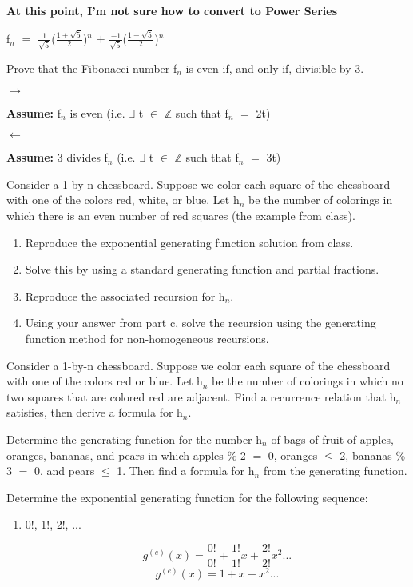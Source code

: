 \documentclass{article}
\newcommand{\mt}[1]{\ensuremath{#1}}
\newcommand{\balist}{\begin{enumerate}[label=\alph*.]}
\newcommand{\elist}{\end{enumerate}}
\newcommand{\as}[1]{\textbf{Assume: } #1}
\newcommand{\bz}{\mt{\mathbb{Z}} }       %
\newcommand{\mem}{\mt{\in} }
\newcommand{\exs}{\mt{\exists} }
\newcommand{\lra}{ \mt{\longrightarrow} } %
\newcommand{\lla}{ \mt{\longleftarrow} }  %
\newcommand{\ps}{\mt{+} }
\newcommand{\lse}{\mt{\leq} }
\newcommand{\eql}{\mt{=} }
\newcommand{\uw}[2]{#1\mt{_{#2}}}
\newcommand{\uf}[2]{#1\mt{^{#2}}}
\newcommand{\frc}[2]{\mt{\frac{#1}{#2}}}
\newcommand{\eqn}[1]{\[#1\]}
\begin{document}
\begin{enumerate}
   \textbf{At this point, I'm not sure how to convert to Power Series}
   
   \uw{f}{n} \eql \frc{1}{\sqrt{5}}\uf{(\frc{1 + \sqrt{5}}{2})}{n} \ps \frc{-1}{\sqrt{5}}\uf{(\frc{1 - \sqrt{5}}{2})}{n}
   
   
   \elist
   \item Prove that the Fibonacci number \uw{f}{n} is even if, and only if, divisible by 3.
   
   \lra
   
   \as{\uw{f}{n} is even (i.e. \exs t \mem \bz such that \uw{f}{n} \eql 2t)}
   
   \lla
   
   \as{3 divides \uw{f}{n} (i.e. \exs t \mem \bz such that \uw{f}{n} \eql 3t)}
   
   \item Consider a 1-by-n chessboard. Suppose we color each square of the chessboard with one of the colors red, white, or blue. Let \uw{h}{n} be the number of colorings in which there is an even number of red squares (the example from class).
   \balist
   \item Reproduce the exponential generating function solution from class.
   \item Solve this by using a standard generating function and partial fractions.
   \item Reproduce the associated recursion for \uw{h}{n}.
   \item Using your answer from part c, solve the recursion using the generating function method for non-homogeneous recursions.
   \elist
   \item Consider a 1-by-n chessboard. Suppose we color each square of the chessboard with one of the colors red or blue. Let \uw{h}{n} be the number of colorings in which no two squares that are colored red are adjacent. Find a recurrence relation that \uw{h}{n} satisfies, then derive a formula for \uw{h}{n}.
   \item Determine the generating function for the number \uw{h}{n} of bags of fruit of apples, oranges, bananas, and pears in which apples \% 2 \eql 0, oranges \lse 2, bananas \% 3 \eql 0, and pears \lse 1. Then find a formula for \uw{h}{n} from the generating function.
   \item Determine the exponential generating function for the following sequence:
   \balist
   \item 0!, 1!, 2!, ...
   
   \eqn{\uf{g}{(e)}(x) \eql \frac{0!}{0!} + \frac{1!}{1!}x + \frac{2!}{2!}x^2 ... }
   \eqn{\uf{g}{(e)}(x) \eql 1 + x + x^2 ...}
   

\end{enumerate}
\end{document}
